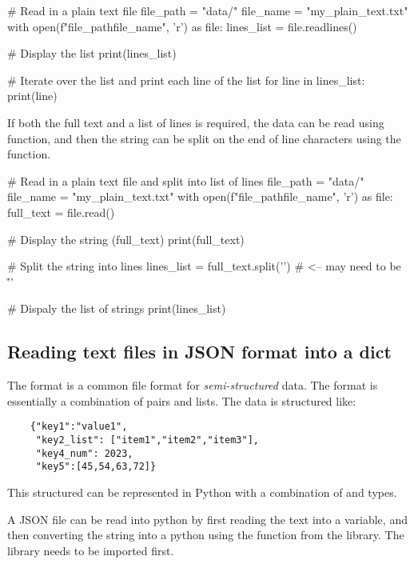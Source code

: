 \begin{pycode}
    # Read in a plain text file
    file_path = "data/"
    file_name = "my_plain_text.txt"
    with open(f"{file_path}{file_name}", 'r') as file:
        lines_list = file.readlines()

    # Display the list
    print(lines_list)

    # Iterate over the list and print each line of the list
    for line in lines_list:
        print(line)
\end{pycode}

If both the full text and a list of lines is required, the data can be read using  function, and then the string can be split on the end of line characters using the  function.


\begin{pycode}
    # Read in a plain text file and split into list of lines
    file_path = "data/"
    file_name = "my_plain_text.txt"
    with open(f"{file_path}{file_name}", 'r') as file:
        full_text = file.read()

    # Display the string (full_text)
    print(full_text)

    # Split the string into lines
    lines_list = full_text.split('\n')  # <-- may need to be '\r\n'

    # Dispaly the  list of strings
    print(lines_list)

\end{pycode}

\subsection{Reading text files in JSON format into a dict}

The  format is a common file format for \textit{semi-structured} data. The format is essentially a combination of  pairs and lists. The data is structured like:

\begin{verbatim}
    {"key1":"value1",
     "key2_list": ["item1","item2","item3"],
     "key4_num": 2023,
     "key5":[45,54,63,72]}
\end{verbatim}

This structured can be represented in Python with a combination of  and  types.

A JSON file can be read into python by first reading the text into a  variable, and then converting the string into a python  using the  function from the  library. The library needs to be imported first.

